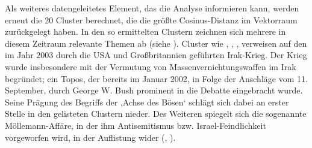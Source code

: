 Als weiteres datengeleitetes Element, das die Analyse informieren kann, werden erneut die 20 Cluster berechnet, die die größte Cosinus-Distanz im Vektorraum zurückgelegt haben. In den so ermittelten Clustern zeichnen sich mehrere in diesem Zeitraum relevante Themen ab (siehe ). Cluster wie , , ,  verweisen auf den im Jahr 2003 durch die USA und Großbritannien geführten Irak-Krieg. Der Krieg wurde insbesondere mit der Vermutung von Massenvernichtungswaffen im Irak begründet; ein Topos, der bereits im Januar 2002, in Folge der Anschläge vom 11. September, durch George W. Bush prominent in die Debatte eingebracht wurde. Seine Prägung des Begriffs der ‚Achse des Bösen` schlägt sich dabei an erster Stelle in den gelisteten Clustern nieder. Des Weiteren spiegelt sich die sogenannte Möllemann-Affäre, in der ihm Antisemitismus bzw. Israel-Feindlichkeit vorgeworfen wird, in der Auflistung wider (, ).

